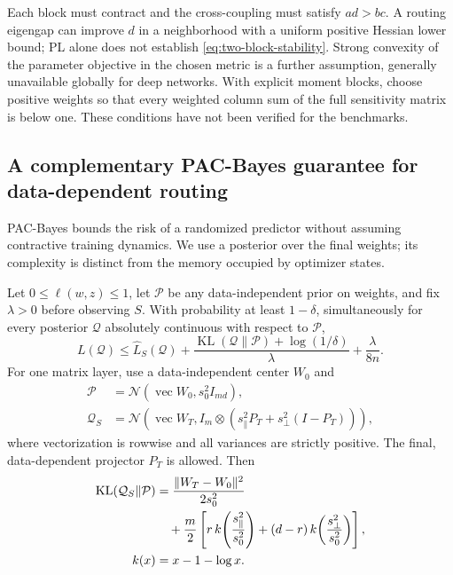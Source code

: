 Each block must contract and the cross-coupling must satisfy $ad>bc$.
A routing eigengap can improve $d$ in a neighborhood with a uniform
positive Hessian lower bound; PL alone does not establish
\eqref{eq:two-block-stability}. Strong convexity of the parameter objective
in the chosen metric is a further assumption, generally unavailable
globally for deep networks. With explicit moment blocks, choose positive
weights so that every weighted column sum of the full sensitivity matrix
is below one. These conditions have not been verified for the benchmarks.

\subsection{A complementary PAC-Bayes guarantee for data-dependent routing}
\label{app:pacbayes}

PAC-Bayes bounds the risk of a randomized predictor without assuming
contractive training dynamics. We use a posterior over the final weights;
its complexity is distinct from the memory occupied by optimizer states.

\begin{proposition}
\label{prop:pacbayes}
Let $0\le\ell(w,z)\le1$, let $\mathcal P$ be any data-independent
prior on weights, and fix $\lambda>0$ before observing $S$. With
probability at least $1-\delta$, simultaneously for every posterior
$\mathcal Q$ absolutely continuous with respect to $\mathcal P$,
\begin{equation}
 L(\mathcal Q)\le\widehat L_S(\mathcal Q)
 +\frac{\operatorname{KL}(\mathcal Q\|\mathcal P)+\log(1/\delta)}{\lambda}
 +\frac{\lambda}{8n}.\label{eq:pac-bayes}
\end{equation}
For one matrix layer, use a data-independent center $W_0$ and
\begin{align}
 \mathcal P&=\mathcal N(\operatorname{vec}W_0,s_0^2I_{md}),\\
 \mathcal Q_S&=\mathcal N(\operatorname{vec}W_T,
                   I_m\otimes(s_\parallel^2P_T+s_\perp^2(I-P_T))),
 \label{eq:routing-posterior}
\end{align}
where vectorization is rowwise and all variances are strictly positive.
The final, data-dependent projector $P_T$ is allowed. Then
\begin{align}
 \operatorname{KL}(\mathcal Q_S\|\mathcal P)
 &=\frac{\|W_T-W_0\|^2}{2s_0^2}\notag\\
 &\quad+\frac m2\left[r\,k\!\left(\frac{s_\parallel^2}{s_0^2}\right)
 +(d-r)\,k\!\left(\frac{s_\perp^2}{s_0^2}\right)\right],
 \label{eq:gaussian-kl}\\
 k(x)&=x-1-\log x.
\end{align}
\end{proposition}

